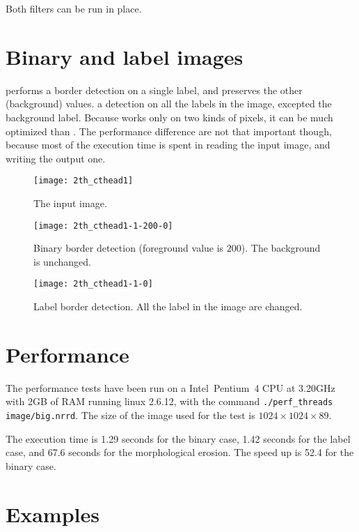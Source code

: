 \documentclass{InsightArticle}
\begin{document}
Both filters can be run in place.

\section{Binary and label images}  performs a border detection on a single label, and preserves the other (background) values.  a detection on all the labels in the image, excepted the background label. Because  works only on two kinds of pixels, it can be much optimized than . The performance difference are not that important though, because most of the execution time is spent in reading the input image, and writing the output one.

\begin{figure}[htbp]
\centering
\texttt{[image: 2th\_cthead1]}
\caption{The input image.\label{cthead1}}
\end{figure}

\begin{figure}[htbp]
\centering
\texttt{[image: 2th\_cthead1-1-200-0]}
\caption{Binary border detection (foreground value is $200$). The background is unchanged.\label{cthead1-bin}}
\end{figure}

\begin{figure}[htbp]
\centering
\texttt{[image: 2th\_cthead1-1-0]}
\caption{Label border detection. All the label in the image are changed.\label{cthead1-label}}
\end{figure}

\section{Performance}

The performance tests have been run on a Intel\circledR~Pentium\circledR~4 CPU at 3.20GHz with 2GB of RAM running linux 2.6.12, with the command \verb$./perf_threads image/big.nrrd$. The size of the image used for the test is $1024 \times 1024 \times 89$.

The execution time is 1.29 seconds for the binary case, 1.42 seconds for the label case, and 67.6 seconds for the morphological erosion. The speed up is 52.4 for the binary case.

\section{Examples}
\end{document}
